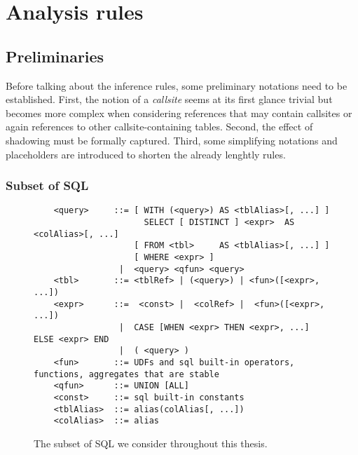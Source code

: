 \chapter{Analysis rules}

\section{Preliminaries}\label{approach}

Before talking about the inference rules, some preliminary notations need to be established. First, the notion of a \textit{callsite} seems at its first glance trivial but becomes more complex when considering references that may contain callsites or again references to other callsite-containing tables. Second, the effect of shadowing must be formally captured. Third, some simplifying notations and placeholders are introduced to shorten the already lenghtly rules.

\subsection{Subset of SQL}
%
%


\begin{figure}[H]
    \begin{verbatim}
    <query>     ::= [ WITH (<query>) AS <tblAlias>[, ...] ]
                      SELECT [ DISTINCT ] <expr>  AS <colAlias>[, ...]
                    [ FROM <tbl>     AS <tblAlias>[, ...] ]
                    [ WHERE <expr> ]
                 |  <query> <qfun> <query>
    <tbl>       ::= <tblRef> | (<query>) | <fun>([<expr>, ...])
    <expr>      ::=  <const> |  <colRef> |  <fun>([<expr>, ...])
                 |  CASE [WHEN <expr> THEN <expr>, ...] ELSE <expr> END
                 |  ( <query> )
    <fun>       ::= UDFs and sql built-in operators, functions, aggregates that are stable
    <qfun>      ::= UNION [ALL]
    <const>     ::= sql built-in constants
    <tblAlias>  ::= alias(colAlias[, ...])
    <colAlias>  ::= alias
    \end{verbatim}
    \caption{The subset of SQL we consider throughout this thesis.}
    \label{lst:sql_grammar}
\end{figure}


